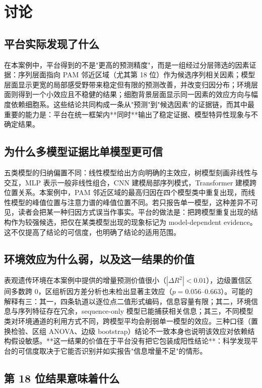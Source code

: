 \section{讨论}
\label{sec:discussion}

\subsection{平台实际发现了什么}

在本案例中，平台得到的不是"更高的预测精度"，而是一组经过分层筛选的因素证据：序列层面指向 PAM 邻近区域（尤其第 18 位）作为候选序列相关因素；模型层面显示更宽的局部感受野带来稳定但有限的预测改善，并改变归因分布；环境层面则得到一个小效应且不稳健的结果；细胞背景层面显示同一因素的效应方向与幅度依赖细胞系。这些结论共同构成一条从"预测"到"候选因素"的证据链，而其中最重要的能力是：平台在统一框架内**同时**输出了稳定证据、模型特异性现象与不确定结果。

\subsection{为什么多模型证据比单模型更可信}

五类模型的归纳偏置不同：线性模型给出方向明确的主效应，树模型刻画非线性与交互，MLP 表示一般非线性组合，CNN 建模局部序列模式，Transformer 建模跨位置关系。本案例中，PAM 邻近区域的最高归因在四个模型类中重复出现，而线性模型的峰值位置与注意力谱的峰值位置不同。若只报告单一模型，这种差异不可见，读者会把某一种归因方式误当作事实。平台的做法是：把跨模型重复出现的结构作为较强候选，把仅在某类模型出现的现象标记为 model-dependent evidence。这不仅提高了结论的可信度，也明确了结论的适用范围。

\subsection{环境效应为什么弱，以及这一结果的价值}

表观遗传环境在本案例中提供的增量预测价值很小（$|\Delta R^{2}|<0.01$），边级置信区间多数跨 0，区组析因方差分析也未检出显著主效应（$p=0.056$--$0.663$）。可能的解释有三：其一，四条轨道以逐位点二值形式编码，信息容量有限；其二，环境信息与序列特征存在冗余，sequence-only 模型已能捕获相关信息；其三，不同模型类对环境通道的利用方式不同，跨模型平均会削弱单一模型的效应。三种口径（置换检验、区组 ANOVA、边级 bootstrap）结论不一致本身也说明该效应对依赖结构假设敏感。**这一结果的价值在于平台没有把它包装成阳性结论**：科学发现平台的可信度取决于它能否识别并如实报告"信息增量不足"的情形。

\subsection{第 18 位结果意味着什么}

